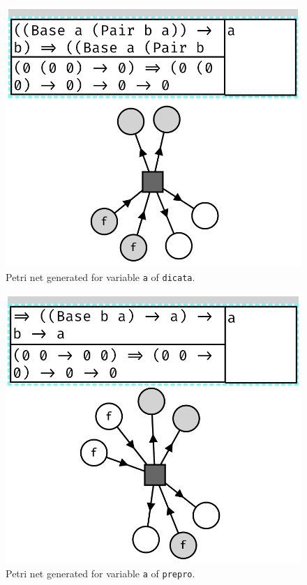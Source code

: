 \documentclass[11pt,openright,hidelinks,a4paper]{article}
\begin{document}
\begin{figure}[H]
\begin{center}
\includegraphics[scale=0.45]{dicata}
\end{center}
\caption{Petri net generated for variable \lstinline{a} of \lstinline{dicata}.}
\label{fig:dicata}
\end{figure}

\begin{figure}[H]
\begin{center}
\includegraphics[scale=0.45]{prepro}
\end{center}
\caption{Petri net generated for variable \lstinline{a} of \lstinline{prepro}.}
\label{fig:prepro}
\end{figure}
\end{document}
